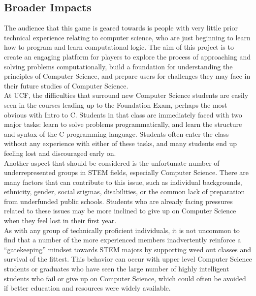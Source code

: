 \subsection{Broader Impacts}

The audience that this game is geared towards is people with very little prior
technical experience relating to computer science, who are just beginning to
learn how to program and learn computational logic. The aim of this project is
to create an engaging platform for players to explore the process of approaching
and solving problems computationally, build a foundation for understanding the
principles of Computer Science, and prepare users for challenges they may face
in their future studies of Computer Science.\\

At UCF, the difficulties that surround new Computer Science students are easily
seen in the courses leading up to the Foundation Exam, perhaps the most obvious
with Intro to C. Students in that class are immediately faced with two major
tasks: learn to solve problems programmatically, and learn the structure and
syntax of the C programming language. Students often enter the class without
any experience with either of these tasks, and many students end up feeling
lost and discouraged early on.\\

Another aspect that should be considered is the unfortunate number of
underrepresented groups in STEM fields, especially Computer Science. There are
many factors that can contribute to this issue, such as individual backgrounds,
ethnicity, gender, social stigmas, disabilities, or the common lack of
preparation from underfunded public schools. Students who are already facing
pressures related to these issues may be more inclined to give up on Computer
Science when they feel lost in their first year.\\

As with any group of technically proficient individuals, it is not uncommon to
find that a number of the more experienced members inadvertently reinforce a
“gatekeeping” mindset towards STEM majors by supporting weed out classes and
survival of the fittest. This behavior can occur with upper level Computer
Science students or graduates who have seen the large number of highly
intelligent students who fail or give up on Computer Science, which could often
be avoided if better education and resources were widely available.\\

